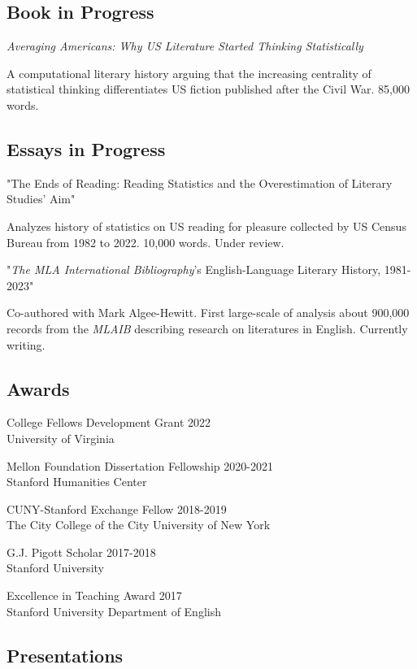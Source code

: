 \documentclass[
  12pt,
  letterpaper,
]{article}
\begin{document}
\hypertarget{book}{%
\subsection{Book in Progress}\label{book}}

\emph{Averaging Americans: Why US Literature Started Thinking Statistically}

A computational literary history arguing that the increasing centrality of statistical thinking differentiates US fiction published after the Civil War. 85,000 words.

\hypertarget{wip}{%
\subsection{Essays in Progress}\label{wip}}

"The Ends of Reading: Reading Statistics and the Overestimation of Literary Studies' Aim"

Analyzes history of statistics on US reading for pleasure collected by US Census Bureau from 1982 to 2022. 10,000 words. Under review.

"\emph{The MLA International Bibliography}'s English-Language Literary History, 1981-2023"

Co-authored with Mark Algee-Hewitt. First large-scale of analysis about 900,000 records from the \emph{MLAIB} describing research on literatures in English. Currently writing.

\hypertarget{awards}{%
\subsection{Awards}\label{awards}}

College Fellows Development Grant \hfill 2022\\
University of Virginia

Mellon Foundation Dissertation Fellowship \hfill 2020-2021\\
Stanford Humanities Center

CUNY-Stanford Exchange Fellow \hfill 2018-2019\\
The City College of the City University of New York

G.J. Pigott Scholar \hfill 2017-2018\\
Stanford University

Excellence in Teaching Award \hfill 2017\\
Stanford University Department of English

\hypertarget{presentations}{%
\subsection{Presentations}\label{presentations}}
\end{document}
